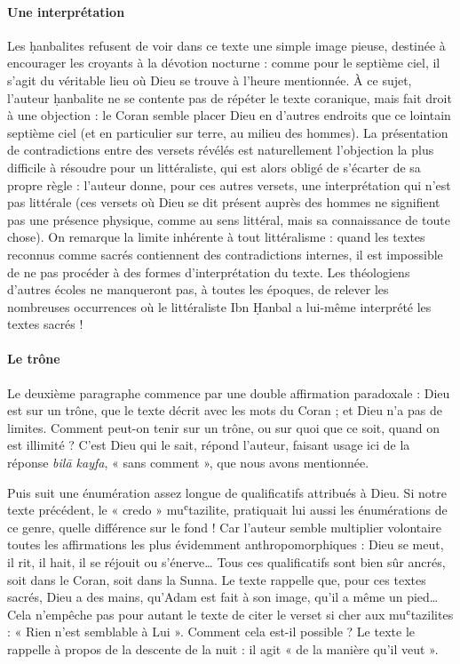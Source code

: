\paragraph{Une interprétation} Les ḥanbalites
refusent de voir dans ce texte une simple image pieuse, destinée à
encourager les croyants à la dévotion nocturne : comme pour le septième
ciel, il s'agit du véritable lieu où Dieu se trouve à l'heure
mentionnée. À ce sujet, l'auteur ḥanbalite ne se contente pas de répéter
le texte coranique, mais fait droit à une objection : le Coran semble
placer Dieu en d'autres endroits que ce lointain septième ciel (et en
particulier sur terre, au milieu des hommes). La présentation de
contradictions entre des versets révélés est naturellement l'objection
la plus difficile à résoudre pour un littéraliste, qui est alors obligé
de s'écarter de sa propre règle : l'auteur donne, pour ces autres
versets, une interprétation qui n'est pas littérale (ces versets où Dieu
se dit présent auprès des hommes ne signifient pas une présence
physique, comme au sens littéral, mais sa connaissance de toute chose).
On remarque la limite inhérente à tout littéralisme : quand les textes
reconnus comme sacrés contiennent des contradictions internes, il est
impossible de
ne pas procéder à des formes d'interprétation du texte. Les théologiens
d'autres écoles ne manqueront pas, à toutes les époques, de relever les
nombreuses occurrences où le littéraliste Ibn Ḥanbal a lui-même
interprété les textes sacrés !

\paragraph{Le trône}Le deuxième paragraphe commence par une double affirmation paradoxale :
Dieu est sur un trône, que le texte décrit avec les mots du Coran ; et
Dieu n'a pas de limites. Comment peut-on tenir sur un trône, ou sur quoi
que ce soit, quand on est illimité ? C'est Dieu qui le sait, répond
l'auteur, faisant usage ici de la réponse \emph{bilā kayfa}, « sans
comment », que nous avons mentionnée.

Puis suit une énumération assez longue de qualificatifs attribués à
Dieu. Si notre texte précédent, le « credo » muʿtazilite, pratiquait lui
aussi les énumérations de ce genre, quelle différence sur le fond ! Car
l'auteur semble multiplier volontaire toutes les affirmations les plus
évidemment anthropomorphiques : Dieu se meut, il rit, il hait, il se
réjouit ou s'énerve\ldots{} Tous ces qualificatifs sont bien sûr ancrés,
soit dans le Coran, soit dans la Sunna. Le texte rappelle que, pour ces
textes sacrés, Dieu a des mains, qu'Adam est fait à son image, qu'il a
même un pied\ldots{} Cela n'empêche pas pour autant le texte de citer le
verset si cher aux muʿtazilites : « Rien n'est semblable à Lui ».
Comment cela est-il possible ? Le texte le rappelle à propos de la
descente de la nuit : il agit « de la manière qu'il veut ».

